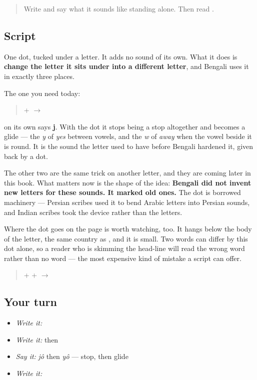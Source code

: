 \begin{quote}
Write \textbf{} and say what it sounds like standing alone. Then read \textbf{}.
\end{quote}

\subsection*{Script}
\begin{quote}
\end{quote}

One dot, tucked under a letter. It adds no sound of its own. What it does is \textbf{change the letter it sits under into a different letter}, and Bengali uses it in exactly three places.

The one you need today:

\begin{quote}
\textbf{} + \textbf{} $\to$ \textbf{}
\end{quote}

\textbf{} on its own says \textbf{j}. With the dot it stops being a stop altogether and becomes a glide — the \emph{y} of \emph{yes} between vowels, and the \emph{w} of \emph{away} when the vowel beside it is round. It is the sound the letter used to have before Bengali hardened it, given back by a dot.

The other two are the same trick on another letter, and they are coming later in this book. What matters now is the shape of the idea: \textbf{Bengali did not invent new letters for these sounds. It marked old ones.} The dot is borrowed machinery — Persian scribes used it to bend Arabic letters into Persian sounds, and Indian scribes took the device rather than the letters.

Where the dot goes on the page is worth watching, too. It hangs below the body of the letter, the same country as \textbf{}, and it is small. Two words can differ by this dot alone, so a reader who is skimming the head-line will read the wrong word rather than no word — the most expensive kind of mistake a script can offer.

\begin{quote}
\textbf{} + \textbf{} + \textbf{} $\to$ \textbf{}
\end{quote}

\subsection*{Your turn}
\begin{itemize}
\raggedright
  \item \emph{Write it:} 
  \item \emph{Write it:}  then 
  \item \emph{Say it:} \emph{jô} then \emph{yô} — stop, then glide
  \item \emph{Write it:} 
\end{itemize}

